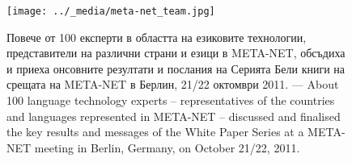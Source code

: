 \documentclass[]{../../metanetpaper}
\begin{document}
\begin{figure}[htbp]
  \center
  \texttt{[image: ../\_media/meta-net\_team.jpg]}
  \caption{Повече от 100 експерти в областта на езиковите технологии, представители на различни страни и езици в META-NET, обсъдиха и приеха онсовните резултати и послания на Серията Бели книги на срещата на  META-NET в Берлин, 21/22 октомври 2011. --- \textcolor{grey1}{About 100 language technology experts -- representatives of the countries and languages represented in META-NET -- discussed and finalised the key results and messages of the White Paper Series at a META-NET meeting in Berlin, Germany, on October 21/22, 2011.}}
  \medskip
\end{figure}

\cleardoublepage

\label{whitepaperseries}
\end{document}
